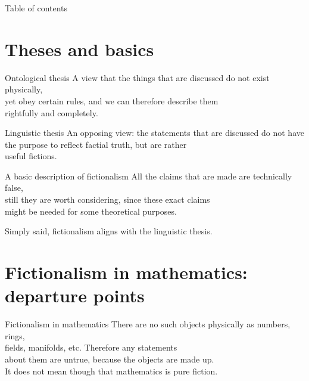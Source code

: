 \documentclass[12pt,aspectratio=169,svgnames]{beamer}
\begin{document}
\begin{frame}
	\maketitle
\end{frame}

\begin{frame}{Table of contents}
	\tableofcontents
\end{frame}

\section{Theses and basics}

\begin{frame}{Ontological thesis}
	A view that the things that are discussed do not exist physically, \\
	yet obey certain rules, and we can therefore describe them \\
	rightfully and completely.
\end{frame}

\begin{frame}{Linguistic thesis}
	An opposing view: the statements that are discussed do not have \\
	the purpose to reflect factial truth, but are rather \\
	useful fictions.
\end{frame}

\begin{frame}{A basic description of fictionalism}
	All the claims that are made are technically false, \\
	still they are worth considering, since these exact claims \\
	might be needed for some theoretical purposes. \bigskip

	Simply said, fictionalism aligns with the linguistic thesis.
\end{frame}

\section{Fictionalism in mathematics: departure points}

\begin{frame}{Fictionalism in mathematics}
	There are no such objects physically as numbers, rings, \\
	fields, manifolds, etc. Therefore any statements \\
	about them are untrue, because the objects are made up. \\
	It does not mean though that mathematics is pure fiction.
\end{frame}
\end{document}
